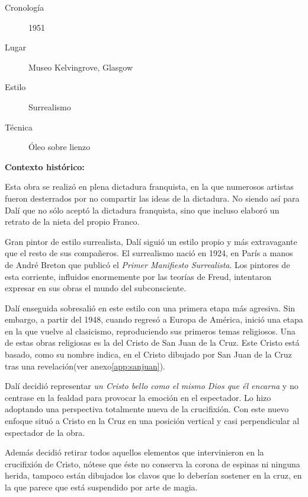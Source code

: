 
\begin{description}
\item[Cronología] 1951
\item[Lugar] Museo Kelvingrove, Glasgow
\item[Estilo] Surrealismo
\item[Técnica] Óleo sobre lienzo
\end{description}

\textbf{Contexto histórico:}

Esta obra se realizó en plena dictadura franquista, en la que numerosos artistas fueron desterrados por no compartir las ideas de la dictadura. No siendo así para Dalí que no sólo aceptó la dictadura franquista, sino que incluso elaboró un retrato de la nieta del propio Franco.

Gran pintor de estilo surrealista, Dalí siguió un estilo propio y más extravagante que el resto de sus compañeros. El surrealismo nació en 1924, en París a manos de André Breton que publicó el \textit{Primer Manifiesto Surrealista}. Los pintores de esta corriente, influidos enormemente por las teorías de Freud, intentaron expresar en sus obras el mundo del subconsciente.

Dalí enseguida sobresalió en este estilo con una primera etapa más agresiva. Sin embargo, a partir del 1948, cuando regresó a Europa de América, inició una etapa en la que vuelve al clasicismo, reproduciendo sus primeros temas religiosos. Una de estas obras religiosas es la del Cristo de San Juan de la Cruz. Este Cristo está basado, como su nombre indica, en el Cristo dibujado por San Juan de la Cruz tras una revelación(ver anexo\autoref{app:sanjuan}).

Dalí decidió representar \textit{un Cristo bello como el mismo Dios que él encarna} y no centrase en la fealdad para provocar la emoción en el espectador. Lo hizo adoptando una perspectiva totalmente nueva de la crucifixión. Con este nuevo enfoque situó a Cristo en la Cruz en una posición vertical y casi perpendicular al espectador de la obra.

Además decidió retirar todos aquellos elementos que intervinieron en la crucifixión de Cristo, nótese que éste no conserva la corona de espinas ni ninguna herida, tampoco están dibujados los clavos que lo deberían sostener en la cruz, en la que parece que está suspendido por arte de magia.

